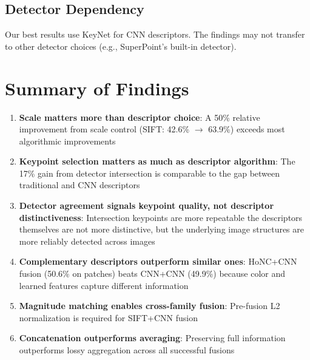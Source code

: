 \subsection{Detector Dependency}

Our best results use KeyNet for CNN descriptors. The findings may not transfer to other detector choices (e.g., SuperPoint's built-in detector).

\section{Summary of Findings}

\begin{enumerate}
    \item \textbf{Scale matters more than descriptor choice}: A 50\% relative improvement from scale control (SIFT: 42.6\% $\rightarrow$ 63.9\%) exceeds most algorithmic improvements

    \item \textbf{Keypoint selection matters as much as descriptor algorithm}: The 17\% gain from detector intersection is comparable to the gap between traditional and CNN descriptors

    \item \textbf{Detector agreement signals keypoint quality, not descriptor distinctiveness}: Intersection keypoints are more repeatable the descriptors themselves are not more distinctive, but the underlying image structures are more reliably detected across images

    \item \textbf{Complementary descriptors outperform similar ones}: HoNC+CNN fusion (50.6\% on patches) beats CNN+CNN (49.9\%) because color and learned features capture different information

    \item \textbf{Magnitude matching enables cross-family fusion}: Pre-fusion L2 normalization is required for SIFT+CNN fusion

    \item \textbf{Concatenation outperforms averaging}: Preserving full information outperforms lossy aggregation across all successful fusions
\end{enumerate}
